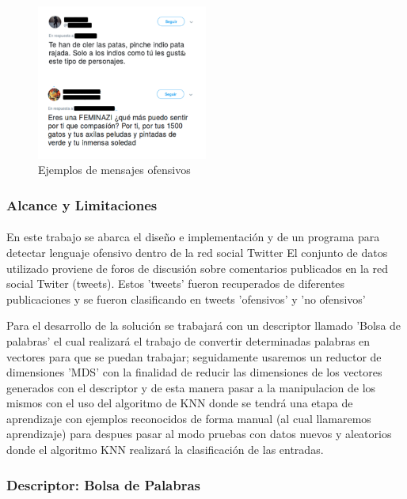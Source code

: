 \documentclass{article}
\begin{document}
\begin{figure}[h!]
	\centering
	\includegraphics[width=0.5\textwidth]{img/tweets_ofensivos.png}
	\caption{Ejemplos de mensajes ofensivos}
	\label{fig:tweets_ofensivos}
\end{figure}

\clearpage
\subsubsection{Alcance y Limitaciones}
\paragraph{}
En este trabajo se abarca el diseño e implementación y de un programa para detectar lenguaje ofensivo dentro de la red social Twitter
El conjunto de datos utilizado proviene de foros de discusión sobre comentarios publicados en la red social Twiter (tweets). Estos 'tweets' fueron recuperados de diferentes publicaciones y se fueron clasificando en tweets 'ofensivos' y 'no ofensivos'

Para el desarrollo de la solución se trabajará con un descriptor llamado 'Bolsa de palabras' el cual realizará el trabajo de convertir determinadas palabras en vectores para que se puedan trabajar; seguidamente usaremos un reductor de dimensiones 'MDS' con la finalidad de reducir las dimensiones de los vectores generados con el descriptor y de esta manera pasar a la manipulacion de los mismos con el uso del algoritmo de KNN donde se tendrá una etapa de aprendizaje con ejemplos reconocidos de forma manual (al cual llamaremos aprendizaje) para despues pasar al modo pruebas con datos nuevos y aleatorios donde el algoritmo KNN realizará la clasificación de las entradas. 

\subsubsection{Descriptor: Bolsa de Palabras}
\end{document}
